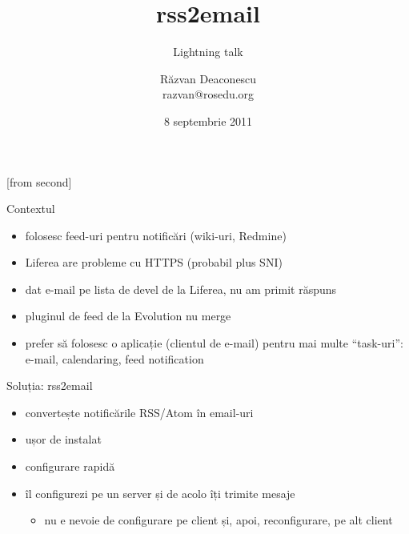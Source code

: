 \documentclass{beamer}
\title[rss2email]{rss2email}
\subtitle{Lightning talk}
\institute{Întâlnirile lunare RLUG -- Septembrie 2011}
\author[Răzvan Deaconescu]{Răzvan Deaconescu\\
      razvan@rosedu.org}
\date{8 septembrie 2011}
\begin{document}
[from second]

\frame{\titlepage}

\begin{frame}{Contextul}
  \begin{itemize}     %
    \item folosesc feed-uri pentru notificări (wiki-uri, Redmine)
    \item Liferea are probleme cu HTTPS (probabil plus SNI)
    \item dat e-mail pe lista de devel de la Liferea, nu am primit răspuns
    \item pluginul de feed de la Evolution nu merge
    \item prefer să folosesc o aplicație (clientul de e-mail) pentru mai multe
    ``task-uri'': e-mail, calendaring, feed notification
  \end{itemize}
\end{frame}

\begin{frame}{Soluția: rss2email}
  \begin{itemize}
    \item convertește notificările RSS/Atom în email-uri
    \item ușor de instalat
    \item configurare rapidă
    \item îl configurezi pe un server și de acolo îți trimite mesaje
      \begin{itemize}
        \item nu e nevoie de configurare pe client și, apoi, reconfigurare, pe
        alt client
      \end{itemize}
  \end{itemize}
\end{frame}
\end{document}
